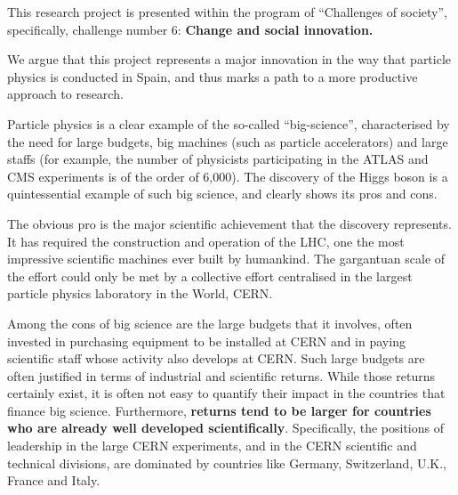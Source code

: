 %
This research project is presented within the program of ``Challenges of society'', specifically, challenge number 6: {\bf Change and social innovation.}

We argue that this project represents a major innovation in the way that particle physics is conducted in Spain, and thus marks a path to a more productive approach to research.

Particle physics is a clear example of the so-called ``big-science'',
characterised by the need for large budgets, big machines (such as particle accelerators) and large staffs (for example, the number of physicists participating in the ATLAS and CMS experiments is of the order of 6,000). The discovery of the Higgs boson is a quintessential example of such big science, and clearly shows its pros and cons. 

The obvious pro is the major scientific achievement that the discovery represents. It has required the construction and operation of the LHC, one the most impressive scientific machines ever built by humankind. The gargantuan scale of the effort could only be met by a collective effort centralised in the largest particle physics laboratory in the World, CERN.  

Among the cons of big science are the large budgets that it involves, often invested in purchasing equipment to be installed at CERN and in paying scientific staff whose activity also develops at CERN. Such large budgets are often justified in terms of industrial and scientific returns. While those returns certainly exist, it is often not easy to quantify their impact in the countries that finance big science. Furthermore, {\bf returns tend to be larger for countries who are already well developed scientifically}. Specifically, the positions of leadership in the large CERN experiments, and in the CERN scientific and technical divisions, are dominated by countries like Germany, Switzerland, U.K., France and Italy. 

